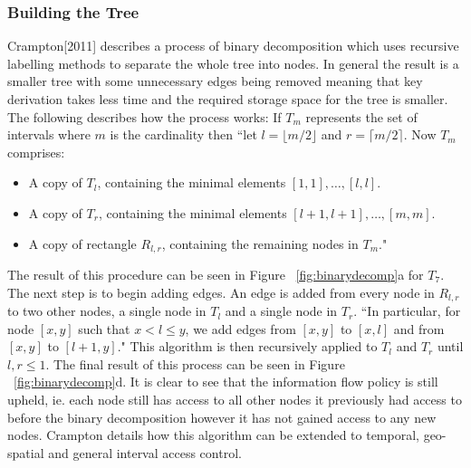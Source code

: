 \documentclass[12pt, titlepage]{article}
\begin{document}
\subsubsection{Building the Tree}
Crampton[2011]\cite{mainPaper} describes a process of binary decomposition which uses recursive labelling methods to separate the whole tree into nodes. In general the result is a smaller tree with some unnecessary edges being removed meaning that key derivation takes less time and the required storage space for the tree is smaller. The following describes how the process works:
\newline \indent If $T_{m}$ represents the set of intervals where $m$ is the cardinality then ``let $l = \lfloor m/2 \rfloor$ and $r = \lceil m/2 \rceil$. Now $T_{m}$ comprises:
\begin{itemize}
\item A copy of $T_{l}$, containing the minimal elements $[1, 1], \dots , [l,l]$.
\item A copy of $T_{r}$, containing the minimal elements $[l + 1, l + 1], \dots , [m, m]$.
\item A copy of rectangle $R_{l,r}$, containing the remaining nodes in $T_{m}$."
\end{itemize}
The result of this procedure can be seen in Figure ~\ref{fig:binarydecomp}a for $T_{7}$.
\newline The next step is to begin adding edges. An edge is added from every node in $R_{l,r}$ to two other nodes, a single node in $T_{l}$ and a single node in $T_{r}$. ``In particular, for node $[x, y]$ such that $x<l≤y$, we add edges from $[x, y]$ to $[x, l]$ and from $[x, y]$ to $[l + 1, y]$."
\newline This algorithm is then recursively applied to $T_{l}$ and $T_{r}$ until $l, r ≤ 1$. The final result of this process can be seen in Figure ~\ref{fig:binarydecomp}d.
\newline \indent It is clear to see that the information flow policy is still upheld, ie. each node still has access to all other nodes it previously had access to before the binary decomposition however it has not gained access to any new nodes.
\newline \indent Crampton details how this algorithm can be extended to temporal, geo-spatial and general interval access control.
\end{document}
